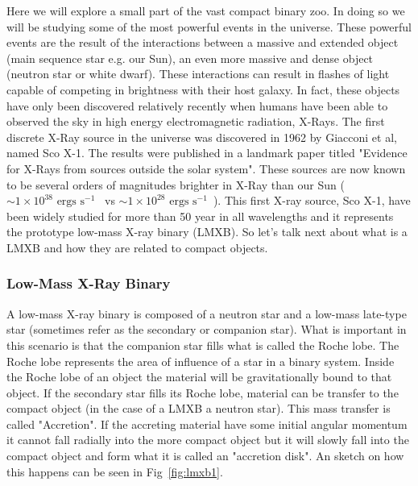 Here we will explore a small part of the vast compact binary zoo. In doing so we will be studying some of the most powerful events in the universe. These powerful events are the result of the interactions between a massive and extended object (main sequence star e.g. our Sun), an even more massive and dense object (neutron star or white dwarf).  These interactions can result in flashes of light capable of competing in brightness with their host galaxy. In fact, these objects have only been discovered relatively recently when humans have been able to observed the sky in high energy electromagnetic radiation, X-Rays. The first discrete X-Ray source in the universe was discovered in 1962 by Giacconi et al, named Sco X-1. The results were published in a landmark paper titled "Evidence for X-Rays from sources outside the solar system". These sources are now known to be several orders of magnitudes brighter in X-Ray than our Sun ($\sim 1 \times 10^{38} \text{ ergs s}^{-1}$~\citep{firstxray} vs $\sim 1 \times 10^{28} \text{ ergs s}^{-1}$~\citep{sunxray}). This first X-ray source, Sco X-1, have been widely studied for more than 50 year in all wavelengths and it represents the prototype low-mass X-ray binary (LMXB). So let's talk next about what is a LMXB and how they are related to compact objects.  


\subsubsection{Low-Mass X-Ray Binary}

A low-mass X-ray binary is composed of a neutron star and a low-mass late-type star (sometimes refer as the secondary or companion star). What is important in this scenario is that the companion star fills what is called the Roche lobe. The Roche lobe represents the area of influence of a star in a binary system. Inside the Roche lobe of an object the material will be gravitationally bound to that object. If the secondary star fills its Roche lobe, material can be transfer to the compact object (in the case of a LMXB a neutron star). This mass transfer is called "Accretion". If the accreting material have some initial angular momentum it cannot fall radially into the more compact object but it will slowly fall into the compact object and form what it is called an "accretion disk". An sketch on how this happens can be seen in Fig~\ref{fig:lmxb1}.

